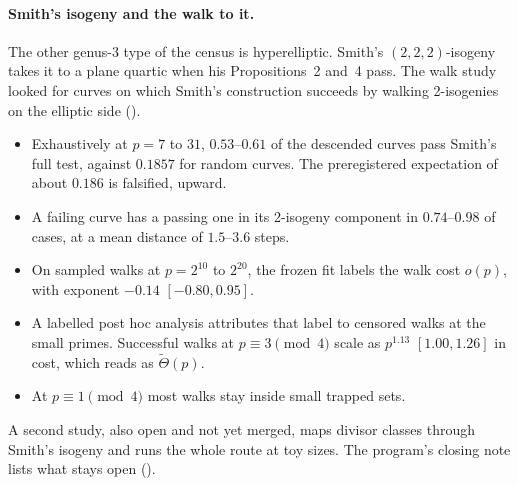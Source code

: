 \paragraph{Smith's isogeny and the walk to it.} The other genus-3 type of the
census is hyperelliptic. Smith's $(2,2,2)$-isogeny takes it to a plane quartic
when his Propositions~2 and~4 pass. The walk study looked for curves on which
Smith's construction succeeds by walking 2-isogenies on the elliptic side
().
\begin{itemize}
  \item Exhaustively at $p=7$ to $31$, $0.53$--$0.61$ of the descended curves
    pass Smith's full test, against $0.1857$ for random curves. The
    preregistered expectation of about $0.186$ is falsified, upward.
  \item A failing curve has a passing one in its 2-isogeny component in
    $0.74$--$0.98$ of cases, at a mean distance of $1.5$--$3.6$ steps.
  \item On sampled walks at $p=2^{10}$ to $2^{20}$, the frozen fit labels the
    walk cost $o(p)$, with exponent $-0.14$ $[-0.80,0.95]$.
  \item A labelled post hoc analysis attributes that label to censored walks
    at the small primes. Successful walks at $p\equiv3\pmod4$ scale as
    $p^{1.13}$ $[1.00,1.26]$ in cost, which reads as $\tilde\Theta(p)$.
  \item At $p\equiv1\pmod4$ most walks stay inside small trapped sets.
\end{itemize}
A second study, also open and not yet merged, maps divisor classes through
Smith's isogeny and runs the whole route at toy sizes. The program's closing
note lists what stays open ().

